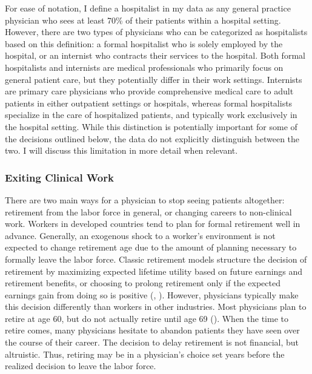 \documentclass[12pt]{article}
\begin{document}
For ease of notation, I define a hospitalist in my data as any general practice physician who sees at least 70\% of their patients within a hospital setting. However, there are two types of physicians who can be categorized as hospitalists based on this definition: a formal hospitalist who is solely employed by the hospital, or an internist who contracts their services to the hospital. Both formal hospitalists and internists are medical professionals who primarily focus on general patient care, but they potentially differ in their work settings. Internists are primary care physicians who provide comprehensive medical care to adult patients in either outpatient settings or hospitals, whereas formal hospitalists specialize in the care of hospitalized patients, and typically work exclusively in the hospital setting. While this distinction is potentially important for some of the decisions outlined below, the data do not explicitly distinguish between the two. I will discuss this limitation in more detail when relevant. 

\subsubsection{Exiting Clinical Work}

There are two main ways for a physician to stop seeing patients altogether: retirement from the labor force in general, or changing careers to non-clinical work. Workers in developed countries tend to plan for formal retirement well in advance. Generally, an exogenous shock to a worker's environment is not expected to change retirement age due to the amount of planning necessary to formally leave the labor force. Classic retirement models structure the decision of retirement by maximizing expected lifetime utility based on future earnings and retirement benefits, or choosing to prolong retirement only if the expected earnings gain from doing so is positive (\cite{gustman1986disaggregated}, \cite{stock1990pension}). However, physicians typically make this decision differently than workers in other industries. Most physicians plan to retire at age 60, but do not actually retire until age 69 (\cite{collier2017challenges}). When the time to retire comes, many physicians hesitate to abandon patients they have seen over the course of their career. The decision to delay retirement is not financial, but altruistic. Thus, retiring may be in a physician's choice set years before the realized decision to leave the labor force. 
\end{document}
